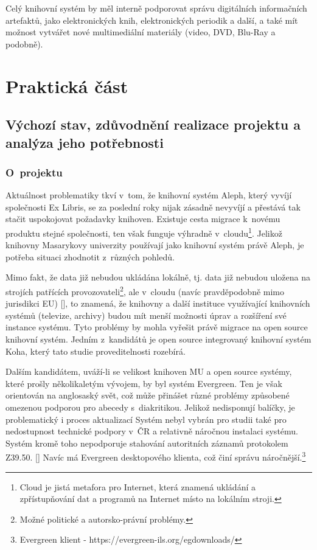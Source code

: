 \documentclass[
	11pt, oneside, printed, final, palatino, monochrome
	microtype,
	table,   %
	lof,     %
	lot     %
]{fithesis3}
\newcommand{\citepages}[2]{[\cite[#1]{#2}]}
\begin{document}
{Celý knihovní systém by měl interně podporovat správu digitálních informačních artefaktů, jako  elektronických knih, elektronických periodik a další, a také mít možnost vytvářet nové multimediální materiály (video, DVD, Blu-Ray a podobně).

\chapter{Praktická část}

\section{Výchozí stav, zdůvodnění realizace projektu a analýza jeho potřebnosti}

\subsection{O~projektu}

Aktuálnost problematiky tkví v~tom, že knihovní systém Aleph, který vyvíjí společnosti Ex Libris, se za poslední roky nijak zásadně nevyvíjí a přestává tak stačit uspokojovat požadavky knihoven. Existuje cesta migrace k~novému produktu stejné společnosti, ten však funguje výhradně v~cloudu\footnote{Cloud je jistá metafora pro Internet, která znamená ukládání a zpřístupňování dat a programů na Internet místo na lokálním stroji.}. Jelikož knihovny Masarykovy univerzity používají jako knihovní systém právě Aleph, je potřeba situaci zhodnotit z~různých pohledů.

Mimo fakt, že data již nebudou ukládána lokálně, tj. data již nebudou uložena na strojích patřících provozovateli\footnote{Možné politické a autorsko-právní problémy.}, ale v~cloudu (navíc pravděpodobně mimo jurisdikci EU) \citepages{16-17}{breeding_2012}, to znamená, že knihovny a další instituce využívající knihovních systémů (televize, archivy) budou mít menší možnosti úprav a rozšíření své instance systému. Tyto problémy by mohla vyřešit právě migrace na open source knihovní systém. Jedním z~kandidátů je open source integrovaný knihovní systém Koha, který tato studie proveditelnosti rozebírá. 

Dalším kandidátem, uváží-li se velikost knihoven MU a open source systémy, které prošly několikaletým vývojem, by byl systém Evergreen. Ten je však orientován na anglosaský svět, což může přinášet různé problémy způsobené omezenou podporou pro abecedy s~diakritikou. Jelikož nedisponují balíčky, je problematický i proces aktualizací%
 Systém nebyl vybrán pro studii také pro nedostupnost technické podpory v~ČR a relativně náročnou instalaci %
  systému. Systém kromě toho nepodporuje stahování autoritních záznamů protokolem Z39.50. \citepages{10-14}{denar_2015}
 Navíc má Evergreen desktopového klienta, což činí správu náročnější.\footnote{Evergreen klient - https://evergreen-ils.org/egdownloads/}
 
}
\end{document}
